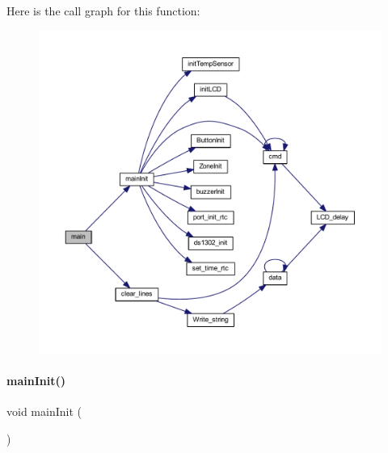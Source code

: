 Here is the call graph for this function\+:
\nopagebreak
\begin{figure}[H]
\begin{center}
\leavevmode
\includegraphics[width=350pt]{a00038_acdef7a1fd863a6d3770c1268cb06add3_cgraph}
\end{center}
\end{figure}
\mbox{\label{a00038_a88b0add1a6947e73e483af43e2203766}} 
\paragraph{main\+Init()}
{\footnotesize\ttfamily void main\+Init (\begin{DoxyParamCaption}{ }\end{DoxyParamCaption})}

